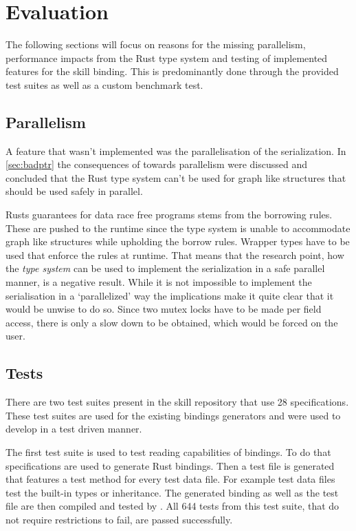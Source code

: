 \documentclass[thesis]{subfiles}
\begin{document}
\chapter{Evaluation}\label{chap:eval}
The following sections will focus on reasons for the missing parallelism, performance impacts from the Rust type system and testing of implemented features for the \gls{skill} binding.
This is predominantly done through the provided test suites as well as a custom benchmark test.

\section{Parallelism}
  A feature that wasn't implemented was the parallelisation of the serialization.
  In \autoref{sec:badptr} the consequences of \PtrT towards parallelism were discussed and concluded that the Rust type system can't be used for graph like structures that should be used safely in parallel.

  Rusts guarantees for data race free programs stems from the borrowing rules.
  These are pushed to the runtime since the type system is unable to accommodate graph like structures while upholding the borrow rules.
  Wrapper types have to be used that enforce the rules at runtime.
  That means that the research point, how the \emph{type system} can be used to implement the serialization in a safe parallel manner, is a negative result.
  While it is not impossible to implement the serialisation in a `parallelized' way the implications make it quite clear that it would be unwise to do so.
  Since two mutex locks have to be made per field access, there is only a slow down to be obtained, which would be forced on the user.

\section{Tests}
  There are two test suites present in the \gls{skill} repository\autocite{skill-repo} that use 28 specifications.
  These test suites are used for the existing bindings generators and were used to develop in a test driven manner.

  The first test suite is used to test reading capabilities of bindings.
  To do that specifications are used to generate Rust bindings.
  Then a test file is generated that features a test method for every test data file.
  For example test data files test the built-in types or inheritance.
  The generated binding as well as the test file are then compiled and tested by .
  All 644 tests from this test suite, that do not require restrictions to fail, are passed successfully.
\end{document}
